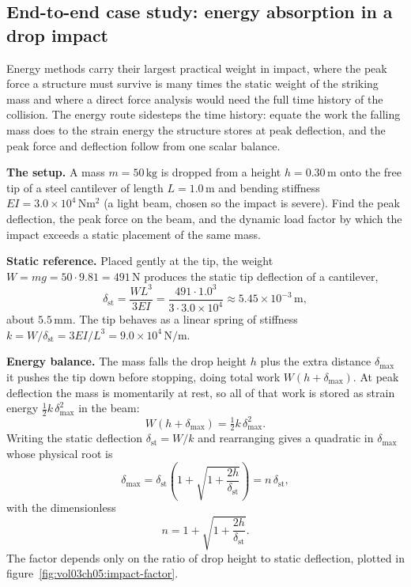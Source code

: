 \subsection{End-to-end case study: energy absorption in a drop impact}

Energy methods carry their largest practical weight in impact, where the
peak force a structure must survive is many times the static weight of
the striking mass and where a direct force analysis would need the full
time history of the collision. The energy route sidesteps the time
history: equate the work the falling mass does to the strain energy the
structure stores at peak deflection, and the peak force and deflection
follow from one scalar balance.

\textbf{The setup.} A mass $m = 50\,\si{\kilogram}$ is dropped from a
height $h = 0.30\,\si{\meter}$ onto the free tip of a steel cantilever of
length $L = 1.0\,\si{\meter}$ and bending stiffness $EI = 3.0\times
10^{4}\,\si{\newton\meter\squared}$ (a light beam, chosen so the impact
is severe). Find the peak deflection, the peak force on the beam, and the
dynamic load factor by which the impact exceeds a static placement of the
same mass.

\textbf{Static reference.} Placed gently at the tip, the weight $W = mg =
50 \cdot 9.81 = 491\,\si{\newton}$ produces the static tip deflection of
a cantilever,
\[
\delta_\text{st} = \frac{W L^3}{3 EI}
= \frac{491 \cdot 1.0^3}{3 \cdot 3.0\times 10^{4}}
\approx 5.45\times 10^{-3}\,\si{\meter},
\]
about $5.5\,\si{\milli\meter}$. The tip behaves as a linear spring of
stiffness $k = W/\delta_\text{st} = 3EI/L^3 = 9.0\times 10^{4}\,
\si{\newton\per\meter}$.

\textbf{Energy balance.} The mass falls the drop height $h$ plus the
extra distance $\delta_\text{max}$ it pushes the tip down before
stopping, doing total work $W(h + \delta_\text{max})$. At peak deflection
the mass is momentarily at rest, so all of that work is stored as strain
energy $\tfrac12 k\,\delta_\text{max}^2$ in the beam:
\[
W(h + \delta_\text{max}) = \tfrac12 k\,\delta_\text{max}^2.
\]
Writing the static deflection $\delta_\text{st} = W/k$ and rearranging
gives a quadratic in $\delta_\text{max}$ whose physical root is
\[
\delta_\text{max} = \delta_\text{st}\left(1 + \sqrt{1 +
\frac{2h}{\delta_\text{st}}}\right) = n\,\delta_\text{st},
\]
with the dimensionless 
\[
n = 1 + \sqrt{1 + \frac{2h}{\delta_\text{st}}}.
\]
The factor depends only on the ratio of drop height to static deflection,
plotted in figure~\ref{fig:vol03ch05:impact-factor}.

